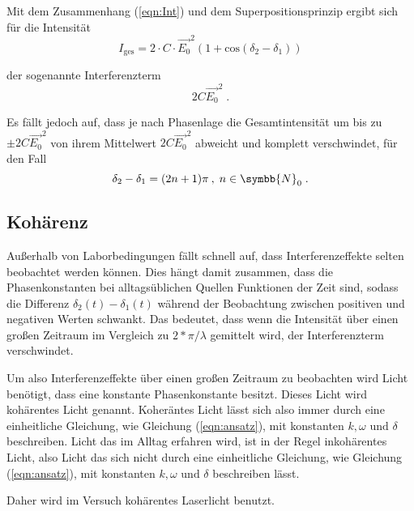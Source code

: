 \noindent
Mit dem Zusammenhang (\ref{eqn:Int}) und dem Superpositionsprinzip ergibt sich für die Intensität 
\begin{equation*}
    I_\text{ges} = 2 \cdot C \cdot \vec{E_0}^2 (1 + \text{cos}(\delta_2 - \delta_1))
\end{equation*}

\noindent 
der sogenannte Interferenzterm 
\begin{equation*}
    2 C \vec{E_0}^2 \; .
\end{equation*}

\noindent 
Es fällt jedoch auf, dass je nach Phasenlage die Gesamtintensität um bis zu $\pm 2 C \vec{E_0}^2$ von ihrem Mittelwert $2 C \vec{E_0}^2$ abweicht und komplett verschwindet, für
den Fall 
\begin{equation}
    \delta_2 - \delta_1 = (2n + 1)\pi \: , \; n \in \symbb{N}_0 \; .
\end{equation}

\subsection{Kohärenz}
Außerhalb von Laborbedingungen fällt schnell auf, dass Interferenzeffekte selten beobachtet werden können. Dies hängt damit zusammen, dass die Phasenkonstanten bei alltagsüblichen Quellen 
Funktionen der Zeit sind, sodass die Differenz $\delta_2(t) - \delta_1(t)$ während der Beobachtung zwischen positiven und negativen Werten schwankt. Das bedeutet, dass wenn die
Intensität über einen großen Zeitraum im Vergleich zu $2*\pi/\lambda$ gemittelt wird, der Interferenzterm verschwindet.

\noindent
Um also Interferenzeffekte über einen großen Zeitraum zu beobachten wird Licht benötigt, dass eine konstante Phasenkonstante besitzt. Dieses Licht wird kohärentes Licht genannt. Koheräntes
Licht lässt sich also immer durch eine einheitliche Gleichung, wie Gleichung (\ref{eqn:ansatz}), mit konstanten $k, \omega \text{ und } \delta$ beschreiben. Licht das im Alltag erfahren wird, 
ist in der Regel inkohärentes Licht, also Licht das sich nicht durch eine einheitliche Gleichung, wie Gleichung (\ref{eqn:ansatz}), mit konstanten $k, \omega \text{ und } \delta$ beschreiben lässt.

\noindent
Daher wird im Versuch kohärentes Laserlicht benutzt.

